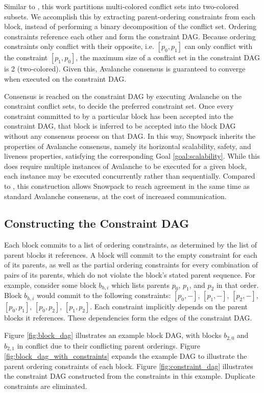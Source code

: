 \documentclass[12pt]{article}
\begin{document}
  Similar to \cite{buchwald2024frosty}, this work partitions multi-colored
  conflict sets into two-colored subsets. We accomplish this by extracting
  parent-ordering constraints from each block, instead of performing a binary
  decomposition of the conflict set. Ordering constraints reference each other
  and form the constraint DAG. Because ordering constraints only conflict with
  their opposite, i.e. $[p_0, p_1]$ can only conflict with the constraint
  $[p_1, p_0]$, the maximum size of a conflict set in the constraint DAG is 2
  (two-colored). Given this, Avalanche consensus is guaranteed to converge when
  executed on the constraint DAG.

  Consensus is reached on the constraint DAG by executing Avalanche on the
  constraint conflict sets, to decide the preferred constraint set. Once every
  constraint committed to by a particular block has been accepted into the
  constraint DAG, that block is inferred to be accepted into the block DAG
  without any consensus process on that DAG. In this way, Snowpack inherits the
  properties of Avalanche consensus, namely its horizontal scalability, safety,
  and liveness properties, satisfying the corresponding Goal
  \ref{goal:scalability}. While this does require multiple instances of
  Avalanche to be executed for a given block, each instance may be executed
  concurrently rather than sequentially. Compared to \cite{buchwald2024frosty}, this
  construction allows Snowpack to reach agreement in the same time as standard
  Avalanche consensus, at the cost of increased communication.

\subsection{Constructing the Constraint DAG}
  Each block commits to a list of ordering constraints, as determined by the
  list of parent blocks it references. A block will commit to the empty
  constraint for each of its parents, as well as the partial ordering
  constraints for every combination of pairs of its parents, which do not
  violate the block's stated parent sequence. For example, consider some block
  $b_{h,i}$ which lists parents $p_0$, $p_1$, and $p_2$ in that order. Block
  $b_{h,i}$ would commit to the following constraints: $[p_0, -]$, $[p_1, -]$,
  $[p_2, -]$, $[p_0, p_1]$, $[p_0, p_2]$, $[p_1, p_2]$. Each constraint
  implicitly depends on the parent blocks it references. These dependencies
  form the edges of the constraint DAG.

  Figure \ref{fig:block_dag} illustrates an example block DAG, with blocks
  $b_{2,0}$ and $b_{2,1}$ in conflict due to their conflicting parent
  orderings. Figure \ref{fig:block_dag_with_constraints} expands the example
  DAG to illustrate the parent ordering constraints of each block. Figure
  \ref{fig:constraint_dag} illustrates the constraint DAG constructed from the
  constraints in this example. Duplicate constraints are eliminated.
\end{document}
